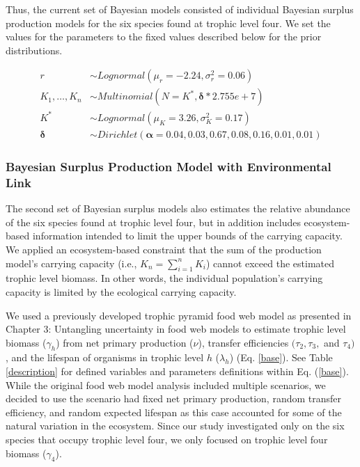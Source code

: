 \documentclass[oneside,12pt,final]{sty/ucthesis-CA2012}
\begin{document}
\begin{mainmatter}
\vspace{5mm}

Thus, the current set of Bayesian models consisted of individual Bayesian surplus production models for the six species found at trophic level four. We set the values for the parameters to the fixed values described below for the prior distributions.

\begin{align*}
r & \sim Lognormal(\mu_r = -2.24, \sigma_r^2 = 0.06) \\
K_1,\dots,K_n & \sim Multinomial(N=K^*, \boldsymbol{\delta}*2.755e+7) \\
K^* & \sim Lognormal(\mu_K = 3.26, \sigma_K^2 = 0.17)  \\
\boldsymbol{\delta} & \sim Dirichlet(\boldsymbol{\alpha}=0.04, 0.03, 0.67, 0.08, 0.16, 0.01, 0.01)
\end{align*}

\subsubsection*{Bayesian Surplus Production Model with Environmental Link}
The second set of Bayesian surplus models also estimates the relative abundance of the six species found at trophic level four, but in addition includes ecosystem-based information intended to limit the upper bounds of the carrying capacity. We applied an ecosystem-based constraint that the sum of the production model's carrying capacity (i.e., $K_n = \sum_{i=1}^{n} K_i$) cannot exceed the estimated trophic level biomass. In other words, the individual population's carrying capacity is limited by the ecological carrying capacity.

\vspace{5mm}

We used a previously developed trophic pyramid food web model as presented in Chapter 3: Untangling uncertainty in food web models to estimate trophic level biomass ($\gamma_h$) from net primary production ($\nu$), transfer efficiencies $(\tau_2, \tau_3,$ and $\tau_4)$, and the lifespan of organisms in trophic level $h$ ($\lambda_h$) (Eq. \ref{base}). See Table \ref{description} for defined variables and parameters definitions within Eq. (\ref{base}). While the original food web model analysis included multiple scenarios, we decided to use the scenario had fixed net primary production, random transfer efficiency, and random expected lifespan as this case accounted for some of the natural variation in the ecosystem. Since our study investigated only on the six species that occupy trophic level four, we only focused on trophic level four biomass ($\gamma_4$). 


\end{mainmatter}
\end{document}
